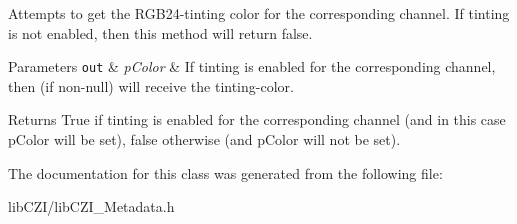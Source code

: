 Attempts to get the R\+G\+B24-\/tinting color for the corresponding channel. If tinting is not enabled, then this method will return false.


\begin{DoxyParams}[1]{Parameters}
\mbox{\tt out}  & {\em p\+Color} & If tinting is enabled for the corresponding channel, then (if non-\/null) will receive the tinting-\/color.\\
\hline
\end{DoxyParams}
\begin{DoxyReturn}{Returns}
True if tinting is enabled for the corresponding channel (and in this case {\ttfamily p\+Color} will be set), false otherwise (and {\ttfamily p\+Color} will not be set). 
\end{DoxyReturn}


The documentation for this class was generated from the following file\+:\begin{DoxyCompactItemize}
\item 
lib\+C\+Z\+I/lib\+C\+Z\+I\+\_\+\+Metadata.\+h\end{DoxyCompactItemize}
